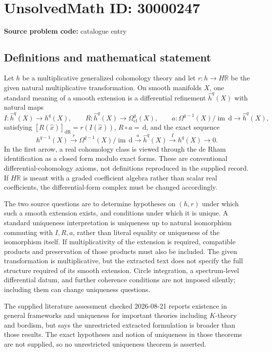 \documentclass[11pt]{article}
\newcommand{\R}{\mathbb{R}}
\newcommand{\dd}{\,\mathrm{d}}
\begin{document}
\section*{UnsolvedMath ID: 30000247}
\textbf{Source problem code:} catalogue entry
\subsection{Definitions and mathematical statement}
Let \(h\) be a multiplicative generalized cohomology theory and let \(r:h\to H\R\) be the given natural multiplicative transformation. On smooth manifolds \(X\), one standard meaning of a smooth extension is a differential refinement \(\widehat h^q(X)\) with natural maps
\[
I:\widehat h^q(X)\to h^q(X),\qquad
R:\widehat h^q(X)\to\Omega^q_{\mathrm{cl}}(X),\qquad
a:\Omega^{q-1}(X)/\operatorname{im}\dd\to\widehat h^q(X),
\]
satisfying \([R(\widehat x)]_{\mathrm{dR}}=r(I(\widehat x))\), \(R\circ a=\dd\), and the exact sequence
\[
h^{q-1}(X)\xrightarrow{r}\Omega^{q-1}(X)/\operatorname{im}\dd
\xrightarrow{a}\widehat h^q(X)\xrightarrow{I}h^q(X)\longrightarrow0.
\]
In the first arrow, a real cohomology class is viewed through the de Rham identification as a closed form modulo exact forms. These are conventional differential-cohomology axioms, not definitions reproduced in the supplied record. If \(H\R\) is meant with a graded coefficient algebra rather than scalar real coefficients, the differential-form complex must be changed accordingly.

The two source questions are to determine hypotheses on \((h,r)\) under which such a smooth extension exists, and conditions under which it is unique. A standard uniqueness interpretation is uniqueness up to natural isomorphism commuting with \(I,R,a\), rather than literal equality or uniqueness of the isomorphism itself. If multiplicativity of the extension is required, compatible products and preservation of those products must also be included. The given transformation is multiplicative, but the extracted text does not specify the full structure required of its smooth extension. Circle integration, a spectrum-level differential datum, and further coherence conditions are not imposed silently; including them can change uniqueness questions.

The supplied literature assessment checked 2026-08-21 reports existence in general frameworks and uniqueness for important theories including \(K\)-theory and bordism, but says the unrestricted extracted formulation is broader than those results. The exact hypotheses and notion of uniqueness in those theorems are not supplied, so no unrestricted uniqueness theorem is asserted.
\end{document}
